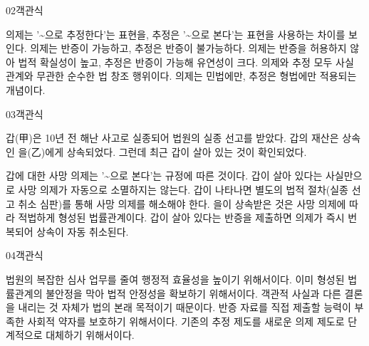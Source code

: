 \documentclass[fs85,seriesWit]{korfarm-base}
\begin{document}
\begin{kfQBlock}{02}{객관식}
\begin{kfChoices}
\kfChoice 의제는 '\textasciitilde{}으로 추정한다'는 표현을, 추정은 '\textasciitilde{}으로 본다'는 표현을 사용하는 차이를 보인다.
\kfChoice 의제는 반증이 가능하고, 추정은 반증이 불가능하다.
\kfChoice 의제는 반증을 허용하지 않아 법적 확실성이 높고, 추정은 반증이 가능해 유연성이 크다.
\kfChoice 의제와 추정 모두 사실 관계와 무관한 순수한 법 창조 행위이다.
\kfChoice 의제는 민법에만, 추정은 형법에만 적용되는 개념이다.
\end{kfChoices}
\end{kfQBlock}

\begin{kfQBlock}{03}{객관식}
\begin{kfEvidence}갑(甲)은 10년 전 해난 사고로 실종되어 법원의 실종 선고를 받았다. 갑의 재산은 상속인 을(乙)에게 상속되었다. 그런데 최근 갑이 살아 있는 것이 확인되었다.\end{kfEvidence}
\begin{kfChoices}
\kfChoice 갑에 대한 사망 의제는 '\textasciitilde{}으로 본다'는 규정에 따른 것이다.
\kfChoice 갑이 살아 있다는 사실만으로 사망 의제가 자동으로 소멸하지는 않는다.
\kfChoice 갑이 나타나면 별도의 법적 절차(실종 선고 취소 심판)를 통해 사망 의제를 해소해야 한다.
\kfChoice 을이 상속받은 것은 사망 의제에 따라 적법하게 형성된 법률관계이다.
\kfChoice 갑이 살아 있다는 반증을 제출하면 의제가 즉시 번복되어 상속이 자동 취소된다.
\end{kfChoices}
\end{kfQBlock}

\begin{kfQBlock}{04}{객관식}
\begin{kfChoices}
\kfChoice 법원의 복잡한 심사 업무를 줄여 행정적 효율성을 높이기 위해서이다.
\kfChoice 이미 형성된 법률관계의 불안정을 막아 법적 안정성을 확보하기 위해서이다.
\kfChoice 객관적 사실과 다른 결론을 내리는 것 자체가 법의 본래 목적이기 때문이다.
\kfChoice 반증 자료를 직접 제출할 능력이 부족한 사회적 약자를 보호하기 위해서이다.
\kfChoice 기존의 추정 제도를 새로운 의제 제도로 단계적으로 대체하기 위해서이다.
\end{kfChoices}
\end{kfQBlock}

\kfEndMC
\end{document}
